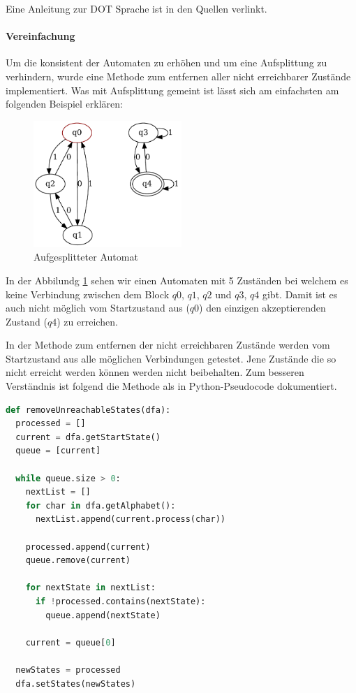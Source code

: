 Eine Anleitung zur DOT Sprache ist in den Quellen verlinkt. \cite{graphvizdotref}


\paragraph{Vereinfachung}
Um die konsistent der Automaten zu erhöhen und um eine Aufsplittung zu verhindern, wurde eine Methode zum entfernen aller nicht erreichbarer Zustände implementiert. Was mit Aufsplittung gemeint ist lässt sich am einfachsten am folgenden Beispiel erklären:

\begin{figure}[h]
  \centering
  \includegraphics[width=0.5\textwidth]{images/split_automaton.pdf}
  \caption[Aufgesplitteter Automat]{Aufgesplitteter Automat}
  \label{fig:split_dfa}
\end{figure}

In der Abbilundg \ref{fig:split_dfa} sehen wir einen Automaten mit 5 Zuständen bei welchem es keine Verbindung zwischen dem Block $q0$, $q1$, $q2$ und $q3$, $q4$ gibt. Damit ist es auch nicht möglich vom Startzustand aus ($q0$) den einzigen akzeptierenden Zustand ($q4$) zu erreichen.

In der Methode zum entfernen der nicht erreichbaren Zustände werden vom Startzustand aus alle möglichen Verbindungen getestet. Jene Zustände die so nicht erreicht werden können werden nicht beibehalten. Zum besseren Verständnis ist folgend die Methode als in Python-Pseudocode dokumentiert.  

\begin{lstlisting}[language=Python, caption={Algorithmus zum entfernen von nicht erreichbaren Zuständen}, label={lst:remove_unreachable_states}]
def removeUnreachableStates(dfa):
  processed = []
  current = dfa.getStartState()
  queue = [current]
  
  while queue.size > 0:
    nextList = []
    for char in dfa.getAlphabet():
      nextList.append(current.process(char))

    processed.append(current)
    queue.remove(current)

    for nextState in nextList:
      if !processed.contains(nextState):
        queue.append(nextState)

    current = queue[0]

  newStates = processed
  dfa.setStates(newStates)
\end{lstlisting}

